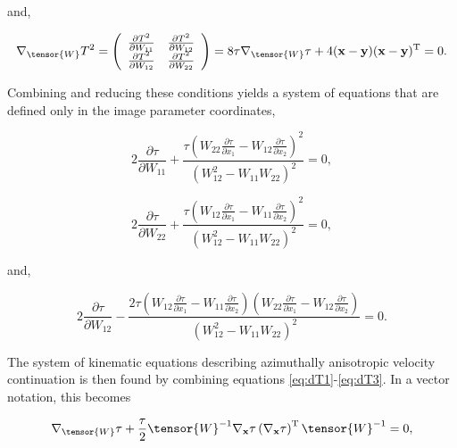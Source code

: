 \noindent and,

\begin{equation}
\label{eq:dTdW}
\nabla _{\tensor{W}}T^2 
=
\left(
\begin{array}{cc}
 \frac{\partial T^2}{\partial W_{11}} &  \frac{\partial T^2}{\partial W_{12}} \\
 \frac{\partial T^2}{\partial W_{12}} &  \frac{\partial T^2}{\partial W_{22}}
\end{array}
\right)
=8\tau \nabla _{\tensor{W}}\tau +4(\mathbf{x}-\mathbf{y})(\mathbf{x}-\mathbf{y})^{\mathrm{T}}=0.
\end{equation}

\noindent Combining and reducing these conditions yields a system of equations that are defined only in the image parameter coordinates,

\begin{equation}
\label{eq:dT1}
2 \frac{\partial \tau }{\partial W_{11}}+\frac{\tau \left(W_{22} \frac{\partial \tau }{\partial x_1}-W_{12} \frac{\partial \tau }{\partial x_2}\right)^2}{\left(W_{12}^2-W_{11}W_{22}\right)^2}=0,
\end{equation}

\begin{equation}
\label{eq:dT2}
2 \frac{\partial \tau }{\partial W_{22}}+\frac{\tau\left(W_{12} \frac{\partial \tau }{\partial x_1}-W_{11} \frac{\partial \tau }{\partial x_2}\right)^2}{\left(W_{12}^2-W_{11}W_{22}\right)^2}=0,
\end{equation}

\noindent and,

\begin{equation}
\label{eq:dT3}
2 \frac{\partial \tau }{\partial W_{12}}-\frac{2\tau \left(W_{12}\frac{\partial \tau }{\partial x_1}-W_{11}\frac{\partial \tau }{\partial x_2}\right)\left(W_{22} \frac{\partial \tau }{\partial x_1}-W_{12} \frac{\partial \tau }{\partial x_2}\right)}{\left(W_{12}^2-W_{11}W_{22}\right)^2}=0.
\end{equation}

\noindent The system of kinematic equations describing azimuthally ani\-sotropic velocity continuation is then found by combining equations \ref{eq:dT1}-\ref{eq:dT3}. 
In a vector notation, this becomes

\begin{equation}
\label{eq:kinematictau}
\nabla _{\tensor{W}}\tau +\frac{\tau }{2}\tensor{W}^{-1} \nabla _{\mathbf{x}}\tau \left( \nabla _{\mathbf{x}}\tau \right)^{\mathrm{T}}\tensor{W}^{-1}=0,
\end{equation}

